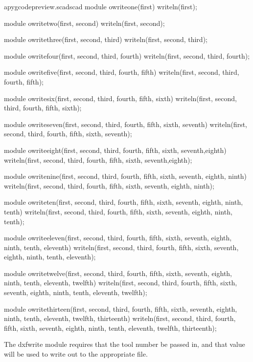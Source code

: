 \documentclass{ltxdoc}
\begin{document}
\lstset{firstnumber=\thepyscad}
\begin{writecode}{a}{pygcodepreview.scad}{scad}
module owriteone(first) {
	writeln(first);
}

module owritetwo(first, second) {
	writeln(first, second);
}

module owritethree(first, second, third) {
	writeln(first, second, third);
}

module owritefour(first, second, third, fourth) {
	writeln(first, second, third, fourth);
}

module owritefive(first, second, third, fourth, fifth) {
	writeln(first, second, third, fourth, fifth);
}

module owritesix(first, second, third, fourth, fifth, sixth) {
	writeln(first, second, third, fourth, fifth, sixth);
}

module owriteseven(first, second, third, fourth, fifth, sixth, seventh) {
	writeln(first, second, third, fourth, fifth, sixth, seventh);
}

module owriteeight(first, second, third, fourth, fifth, sixth, seventh,eighth) {
	writeln(first, second, third, fourth, fifth, sixth, seventh,eighth);
}

module owritenine(first, second, third, fourth, fifth, sixth, seventh, eighth, ninth) {
	writeln(first, second, third, fourth, fifth, sixth, seventh, eighth, ninth);
}

module owriteten(first, second, third, fourth, fifth, sixth, seventh, eighth, ninth, tenth) {
	writeln(first, second, third, fourth, fifth, sixth, seventh, eighth, ninth, tenth);
}

module owriteeleven(first, second, third, fourth, fifth, sixth, seventh, eighth, ninth, tenth, eleventh) {
	writeln(first, second, third, fourth, fifth, sixth, seventh, eighth, ninth, tenth, eleventh);
}

module owritetwelve(first, second, third, fourth, fifth, sixth, seventh, eighth, ninth, tenth, eleventh, twelfth) {
	writeln(first, second, third, fourth, fifth, sixth, seventh, eighth, ninth, tenth, eleventh, twelfth);
}

module owritethirteen(first, second, third, fourth, fifth, sixth, seventh, eighth, ninth, tenth, eleventh, twelfth, thirteenth) {
	writeln(first, second, third, fourth, fifth, sixth, seventh, eighth, ninth, tenth, eleventh, twelfth, thirteenth);
}

\end{writecode}
\addtocounter{pyscad}{52}
 
The dxfwrite module requires that the tool number be passed in, and that value will be used
to write out to the appropriate file.
 
\end{document}
